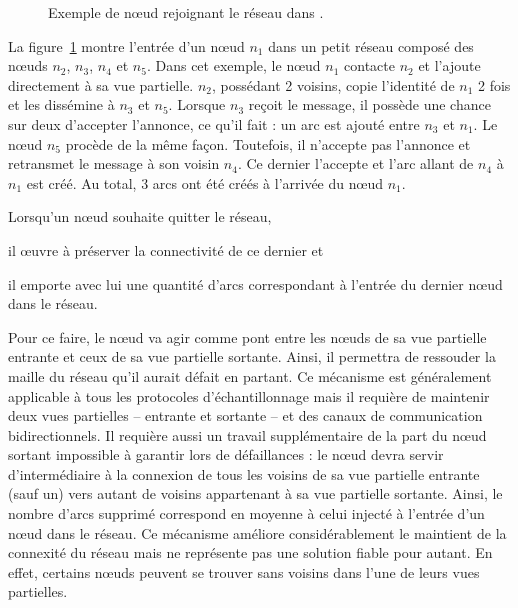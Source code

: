 \begin{figure}
  \centering
  
  \caption[Entrée dans un réseau dans \SCAMP]
  {\label{net:fig:scampexample} Exemple de nœud rejoignant le réseau dans
    \SCAMP.}
\end{figure}

\noindent La figure~\ref{net:fig:scampexample} montre l'entrée d'un nœud $n_1$
dans un petit réseau \SCAMP composé des nœuds $n_2$, $n_3$, $n_4$ et $n_5$. Dans
cet exemple, le nœud $n_1$ contacte $n_2$ et l'ajoute directement à sa vue
partielle. $n_2$, possédant 2 voisins, copie l'identité de $n_1$ 2 fois et les
dissémine à $n_3$ et $n_5$. Lorsque $n_3$ reçoit le message, il possède une
chance sur deux d'accepter l'annonce, ce qu'il fait : un arc est ajouté entre
$n_3$ et $n_1$. Le nœud $n_5$ procède de la même façon. Toutefois, il n'accepte
pas l'annonce et retransmet le message à son voisin $n_4$. Ce dernier l'accepte
et l'arc allant de $n_4$ à $n_1$ est créé. Au total, 3 arcs ont été créés à
l'arrivée du nœud $n_1$.


\noindent Lorsqu'un nœud souhaite quitter le réseau,
\begin{inparaenum}[(i)]
\item il œuvre à préserver la connectivité de ce dernier et
\item il emporte avec lui une quantité d'arcs correspondant à l'entrée du
  dernier nœud dans le réseau.
\end{inparaenum}
Pour ce faire, le nœud va agir comme pont entre les nœuds de sa vue partielle
entrante et ceux de sa vue partielle sortante. Ainsi, il permettra de ressouder
la maille du réseau qu'il aurait défait en partant. Ce mécanisme est
généralement applicable à tous les protocoles d'échantillonnage mais il requière
de maintenir deux vues partielles -- entrante et sortante -- et des canaux de
communication bidirectionnels. Il requière aussi un travail supplémentaire de la
part du nœud sortant impossible à garantir lors de défaillances : le nœud devra
servir d'intermédiaire à la connexion de tous les voisins de sa vue partielle
entrante (sauf un) vers autant de voisins appartenant à sa vue partielle
sortante. Ainsi, le nombre d'arcs supprimé correspond en moyenne à celui injecté
à l'entrée d'un nœud dans le réseau. Ce mécanisme améliore considérablement le
maintient de la connexité du réseau mais ne représente pas une solution fiable
pour autant. En effet, certains nœuds peuvent se trouver sans voisins dans l'une
de leurs vues partielles.
  

